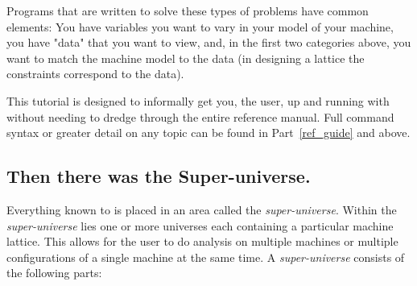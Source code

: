 Programs that are written to solve these types of problems have common
elements: You have variables you want to vary in your model of your
machine, you have "data" that you want to view, and, in the first two
categories above, you want to match the machine model to the data (in
designing a lattice the constraints correspond to the data).

This tutorial is designed to informally get you, the user, up and
running with \tao without needing to dredge through the entire
reference manual. Full command syntax or greater detail on any topic
can be found in Part~\ref{ref_guide} and above.

\subsection{Then there was the Super-universe.}
\label{s:super_universe}

Everything known to \tao is placed in an area called the
\textit{super-universe}. Within the \textit{super-universe} lies one
or more universes each containing a particular machine lattice. This
allows for the user to do analysis on multiple machines or multiple
configurations of a single machine at the same time. A
\textit{super-universe} consists of the following parts:


